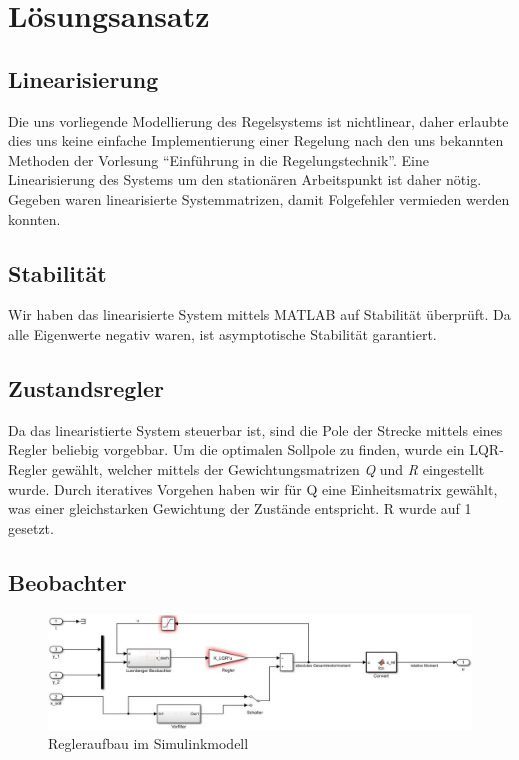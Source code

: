 \documentclass[pdf]{ifacconf}
\begin{document}
	
\section{Lösungsansatz}

	\subsection{Linearisierung}
	Die uns vorliegende Modellierung des Regelsystems ist nichtlinear, daher erlaubte dies uns keine einfache Implementierung einer Regelung nach den uns bekannten Methoden der Vorlesung ``Einführung in die Regelungstechnik''. 
	Eine Linearisierung des Systems um den stationären Arbeitspunkt ist daher nötig. Gegeben waren linearisierte Systemmatrizen, damit Folgefehler vermieden werden konnten. 
	
	\subsection{Stabilität}
	Wir haben das linearisierte System mittels MATLAB auf Stabilität überprüft. Da alle Eigenwerte negativ waren, ist asymptotische Stabilität garantiert.
	
	\subsection{Zustandsregler}
	Da das linearistierte System steuerbar ist, sind die Pole der Strecke mittels eines Regler 			beliebig vorgebbar. Um die optimalen Sollpole zu finden, wurde ein LQR-Regler gewählt, 				welcher mittels der Gewichtungsmatrizen \textit{Q} und \textit{R} eingestellt wurde.
	Durch iteratives Vorgehen haben wir für Q eine Einheitsmatrix gewählt, was einer   					gleichstarken Gewichtung der Zustände entspricht. R wurde auf 1 gesetzt.
	



	\subsection{Beobachter}
	
\begin{figure}[h]	
\centerline{\includegraphics[width=\linewidth]{Bilder/Regler.jpg}}
	\label{Regleraufbau}
	\caption{Regleraufbau im Simulinkmodell}
\end{figure}
\end{document}
